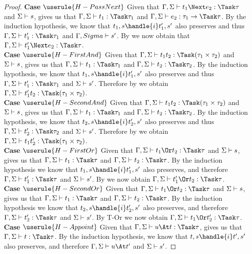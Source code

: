 \begin{proof}
  \noindent\textbf{Case} $\userule{H-PassNext}$ Given that
  $\Gamma,\Sigma\infers t_1\Next e_2:\Task\tau$ and $\Sigma\vdash s$,
   gives us that $\Gamma,\Sigma\infers t_1:\Task\tau_1$ and
  $\Gamma,\Sigma\infers e_2:\tau_1\to\Task\tau$. By the induction hypothesis, we
  know that $t_1,s\handle{i}t_1',s'$ also preserves and thus
  $\Gamma,\Sigma\infers t_1':\Task\tau_1$ and $\Gamma,Sigma\vdash s'$. By
   we now obtain that
  $\Gamma,\Sigma\infers t_1'\Next e_2:\Task\tau$. \\

  \noindent\textbf{Case} $\userule{H-FirstAnd}$ Given that
  $\Gamma,\Sigma\infers t_1\And t_2:\Task(\tau_1\times\tau_2)$ and
  $\Sigma\vdash s$,  gives us that
  $\Gamma,\Sigma\infers t_1:\Task\tau_1$ and
  $\Gamma,\Sigma\infers t_2:\Task\tau_2$. By the induction hypothesis, we know
  that $t_1,s\handle{i}t_1',s'$ also preserves and thus
  $\Gamma,\Sigma\infers t_1':\Task\tau_1$ and $\Sigma\vdash s'$. Therefore by
   we obtain
  $\Gamma,\Sigma\infers t_1'\And t_2:\Task(\tau_1\times\tau_2)$.\\

  \noindent\textbf{Case} $\userule{H-SecondAnd}$ Given that
  $\Gamma,\Sigma\infers t_1\And t_2:\Task(\tau_1\times\tau_2)$ and
  $\Sigma\vdash s$,  gives us that
  $\Gamma,\Sigma\infers t_1:\Task\tau_1$ and
  $\Gamma,\Sigma\infers t_2:\Task\tau_2$. By the induction hypothesis, we know
  that $t_2,s\handle{i}t_2',s'$ also preserves and thus
  $\Gamma,\Sigma\infers t_2':\Task\tau_2$ and $\Sigma\vdash s'$. Therefore by
   we obtain
  $\Gamma,\Sigma\infers t_1\And t_2':\Task(\tau_1\times\tau_2)$.\\

  \noindent\textbf{Case} $\userule{H-FirstOr}$ Given that
  $\Gamma,\Sigma\infers t_1\Or t_2:\Task\tau$ and $\Sigma\vdash s$,
   gives us that $\Gamma,\Sigma\infers t_1:\Task\tau$ and
  $\Gamma,\Sigma\infers t_2:\Task\tau$. By the induction hypothesis we know that
  $t_1,s\handle{i}t_1',s'$ also preserves, and therefore
  $\Gamma,\Sigma\infers t_1':\Task\tau$ and $\Sigma\vdash s'$. By
   we now obtain $\Gamma,\Sigma\infers t_1'\Or t_2:\Task\tau$.\\

  \noindent\textbf{Case} $\userule{H-SecondOr}$ Given that
  $\Gamma,\Sigma\infers t_1\Or t_2:\Task\tau$ and $\Sigma\vdash s$,
   gives us that $\Gamma,\Sigma\infers t_1:\Task\tau$ and
  $\Gamma,\Sigma\infers t_2:\Task\tau$. By the induction hypothesis we know that
  $t_2,s\handle{i}t_2',s'$ also preserves, and therefore
  $\Gamma,\Sigma\infers t_2':\Task\tau$ and $\Sigma\vdash s'$. By T-Or we now
  obtain $\Gamma,\Sigma\infers t_1\Or t_2':\Task\tau$.\\

  \noindent\textbf{Case} $\userule{H-Appoint}$ Given that
  $\Gamma,\Sigma\infers u\At t:\Task\tau$,  gives us that
  $\Gamma,\Sigma\infers t:\Task\tau$. By the induction hypothesis, we know that
  $t,s\handle{i}t',s'$ also preserves, and therefore
  $\Gamma,\Sigma\infers u\At t'$ and $\Sigma\vdash s'$.
\end{proof}

